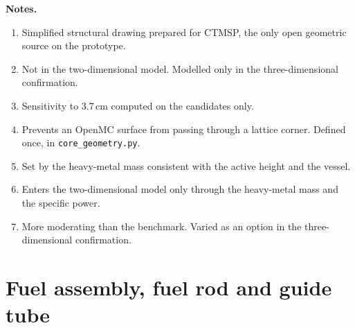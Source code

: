 \noindent \textbf{Notes.}
\begin{enumerate}[label=(\alph*), nosep]
  \item Simplified structural drawing prepared for CTMSP, the only open geometric source on the prototype.
  \item Not in the two-dimensional model. Modelled only in the three-dimensional confirmation.
  \item Sensitivity to 3.7\,cm computed on the candidates only.
  \item Prevents an OpenMC surface from passing through a lattice corner. Defined once, in \texttt{core\_geometry.py}.
  \item Set by the heavy-metal mass consistent with the active height and the vessel.
  \item Enters the two-dimensional model only through the heavy-metal mass and the specific power.
  \item More moderating than the benchmark. Varied as an option in the three-dimensional confirmation.
\end{enumerate}

\section{Fuel assembly, fuel rod and guide tube}
\label{app:inputs-assembly}

